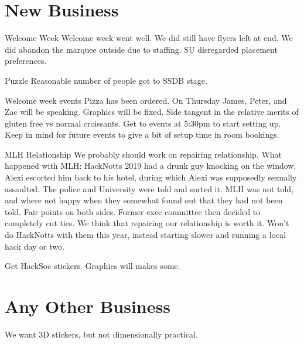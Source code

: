 \documentclass[11pt,hacksoc]{meetingmins}
\begin{document}
\section{New Business}
\begin{items}


  \item Welcome Week
  \subitem Welcome week went well.
  \subitem We did still have flyers left at end.
  \subitem We did abandon the marquee outside due to staffing.
  \subitem SU disregarded placement preferences.

  \item Puzzle
  \subitem Reasonable number of people got to SSDB stage.

  \item Welcome week events
  \subitem Pizza has been ordered.
  \subitem On Thursday James, Peter, and Zac will be speaking.
  \subitem Graphics will be fixed.
  \subitem Side tangent in the relative merits of gluten free vs normal croissants.
  \subitem Get to events at 5:30pm to start setting up.
  \subitem Keep in mind for future events to give a bit of setup time in room bookings.

  \item MLH Relationship
  \subitem We probably should work on repairing relationship.
  \subitem What happened with MLH:
  \subsubitem HackNotts 2019 had a drunk guy knocking on the window.
  \subsubitem Alexi escorted him back to his hotel, during which Alexi was supposedly sexually assaulted. The police and University were told and sorted it.
  \subsubitem MLH was not told, and where not happy when they somewhat found out that they had not been told.
  \subsubitem Fair points on both sides.
  \subsubitem Former exec committee then decided to completely cut ties.
  \subsubitem We think that repairing our relationship is worth it.
  \subsubitem Won't do HackNotts with them this year, instead starting slower and running a local hack day or two.

  \item Get HackSoc stickers. Graphics will makes some.

\end{items}

\section{Any Other Business}
\begin{items}
  \item We want 3D stickers, but not dimensionally practical.
\end{items}

\vspace{1em}
\nextmeeting{}
\end{document}
